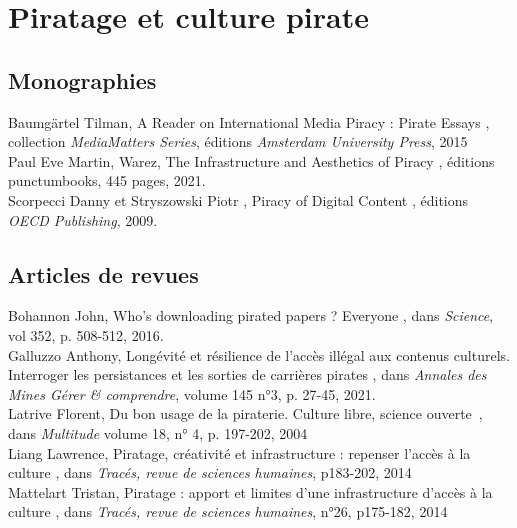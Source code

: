 \section*{Piratage et culture pirate}

\subsection*{ Monographies}

Baumgärtel Tilman, \guillemetleft A Reader on International Media Piracy : Pirate Essays \guillemetright, collection \textit{MediaMatters Series}, éditions \textit{Amsterdam University Press}, 2015\\

Paul Eve Martin, \og Warez, The Infrastructure and Aesthetics of Piracy \fg, éditions punctumbooks, 445 pages, 2021.\\

Scorpecci Danny et Stryszowski Piotr , \og Piracy of Digital Content \fg, éditions \textit{OECD Publishing}, 2009.

\subsection*{Articles de revues }

Bohannon John, \og Who's downloading pirated papers ? Everyone \fg, dans \textit{Science}, vol 352, p. 508-512, 2016. \\

Galluzzo Anthony, \og Longévité et résilience de l’accès illégal aux contenus culturels. Interroger les persistances et les sorties de carrières pirates \fg, dans \textit{Annales des Mines \- Gérer \& comprendre}, volume 145 n°3, p. 27-45, 2021. \\

Latrive Florent, \guillemetleft Du bon usage de la piraterie. Culture libre, science ouverte~\guillemetright, dans \textit{Multitude} volume 18, n° 4, p. 197-202, 2004 \\

Liang Lawrence, \guillemetleft Piratage, créativité et infrastructure : repenser l'accès à la culture \guillemetright, dans \textit{Tracés, revue de sciences humaines}, p183-202, 2014\\

Mattelart Tristan, \guillemetleft Piratage : apport et limites d'une infrastructure d'accès à la culture \guillemetright, dans \textit{Tracés, revue de sciences humaines}, n°26, p175-182, 2014\\

